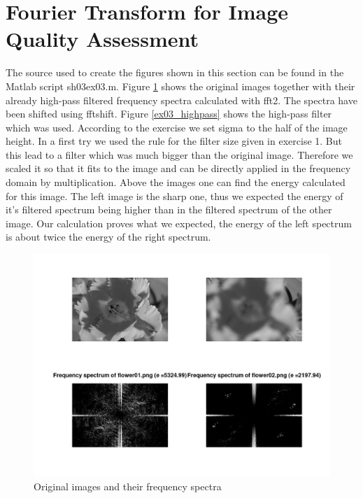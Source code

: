\documentclass{article}
\begin{document}
\section{Fourier Transform for Image Quality Assessment}
The source used to create the figures shown in this section can be found in the Matlab script sh03ex03.m.
Figure \ref{ex03} shows the original images together with their already high-pass filtered frequency spectra calculated with fft2. The spectra have been shifted using fftshift. Figure \ref{ex03_highpass} shows the high-pass filter which was used. According to the exercise we set sigma to the half of the image height. In a first try we used the rule for the filter size given in exercise 1. But this lead to a filter which was much bigger than the original image. Therefore we scaled it so that it fits to the image and can be directly applied in the frequency domain by multiplication. Above the images one can find the energy calculated for this image. The left image is the sharp one, thus we expected the energy of it's filtered spectrum being higher than in the filtered spectrum of the other image. Our calculation proves what we expected, the energy of the left spectrum is about twice the energy of the right spectrum.

\begin{figure}[H]
  \begin{center}
    \includegraphics[width=\textwidth]{./images/ex03_1.png}
    \caption{Original images and their frequency spectra}
    \label{ex03}
  \end{center}
\end{figure}
\end{document}
